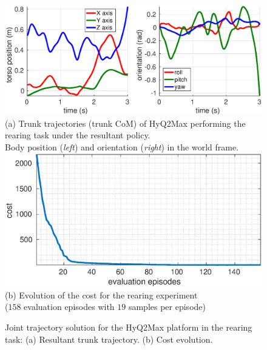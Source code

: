 \documentclass[usletter, 10pt, conference]{ieeeconf}      %
\begin{document}
\begin{figure}[h!]
 \centering
 \hspace*{-8mm}
 \includegraphics[scale=.37]{PRec_solution_joints_1_ICRA.eps} \\
 \small
  (a) Trunk trajectories (trunk CoM) of HyQ2Max performing the rearing task under the resultant policy. \\
  Body position (\textit{left}) and orientation (\textit{right}) in the world frame.
  \hspace*{-4mm}
  \includegraphics[scale=.37]{PRec_solution_1_ICRA.eps}\\
  (b) Evolution of the cost for the rearing experiment\\ ($158$ evaluation episodes with $19$ samples per episode)
  \normalsize
  \caption{ Joint trajectory solution for the HyQ2Max platform in the rearing task:
  (a) Resultant trunk trajectory. (b) Cost evolution.}
  \label{fig:rearing_plots}
\end{figure}
\end{document}

